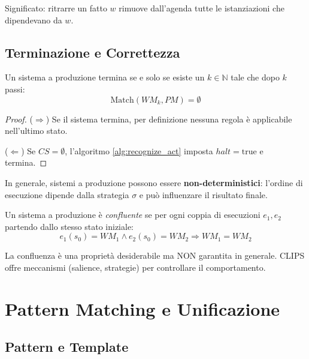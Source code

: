 Significato: ritrarre un fatto $w$ rimuove dall'agenda tutte le istanziazioni che dipendevano da $w$.

\subsection{Terminazione e Correttezza}

\begin{teorema}[Terminazione]
Un sistema a produzione termina se e solo se esiste un $k \in \mathbb{N}$ tale che dopo $k$ passi:
\begin{equation}
\text{Match}(WM_k, PM) = \emptyset
\end{equation}
\end{teorema}

\begin{proof}
($\Rightarrow$) Se il sistema termina, per definizione nessuna regola è applicabile nell'ultimo stato.

($\Leftarrow$) Se $CS = \emptyset$, l'algoritmo \ref{alg:recognize_act} imposta $halt = \text{true}$ e termina.
\end{proof}

\begin{warningbox}
In generale, sistemi a produzione possono essere \textbf{non-deterministici}: l'ordine di esecuzione dipende dalla strategia $\sigma$ e può influenzare il risultato finale.
\end{warningbox}

\begin{teorema}[Confluenza]
Un sistema a produzione è \textit{confluente} se per ogni coppia di esecuzioni $e_1, e_2$ partendo dallo stesso stato iniziale:
\begin{equation}
e_1(s_0) = WM_1 \land e_2(s_0) = WM_2 \Rightarrow WM_1 = WM_2
\end{equation}
\end{teorema}

\begin{osservazione}
La confluenza è una proprietà desiderabile ma NON garantita in generale. CLIPS offre meccanismi (salience, strategie) per controllare il comportamento.
\end{osservazione}

\section{Pattern Matching e Unificazione}

\subsection{Pattern e Template}


